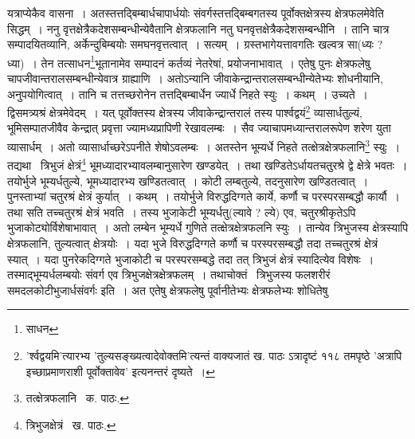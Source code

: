 \documentclass[11pt, openany]{book}
\begin{document}
\noindent यत्राप्येकैव वासना~। अतस्तत्तद्बिम्बार्धचापार्धयोः संवर्गस्तत्तद्बिम्बगतस्य पूर्वोक्तक्षेत्रस्य क्षेत्रफलमेवेति सिद्धम्~। ननु वृत्तक्षेत्रैकदेशसम्बन्धीन्येवैतानि क्षेत्रफलानि नतु घनवृत्तक्षेत्रैकदेशसम्बन्धीनि~। तानि चात्र सम्पादयितव्यानि, अर्केन्दुबिम्बयोः समघनवृत्तत्वात्~। सत्यम्~। ग्रस्तभागेयत्तावगतिः खल्वत्र सा(ध्यः ? ध्या)~। तेन तत्साधन\renewcommand{\thefootnote}{१}\footnote{साधन}भूतानामेव सम्पादनं कर्तव्यं नेतरेषां, प्रयोजनाभावात्~। एतेषु पुनः क्षेत्रफलेषु चापजीवान्तरालसम्बन्धीन्येवात्र ग्राह्याणि~। अतोऽन्यानि जीवाकेन्द्रान्तरालसम्बन्धीन्येतेभ्यः शोधनीयानि, अनुपयोगित्वात्~। तानि च तत्तच्छरोनेन तत्तद्बिम्बार्धेन ज्यार्धे निहते स्युः~। कथम्~। उच्यते~। द्विसमत्र्यश्रं क्षेत्रमेवेदम्~। यत् पूर्वोक्तस्य क्षेत्रस्य जीवाकेन्द्रान्तरालं तस्य पार्श्वद्वयं\renewcommand{\thefootnote}{*}\footnote{'र्श्वद्वयमि'त्यारभ्य 'तुल्यसङ्ख्यत्वादेवोक्तमि'त्यन्तं वाक्यजातं ख. पाठः ऽत्रादृष्टं ११८ तमपृष्ठे 'अत्रापि इच्छाप्रमाणराशी पूर्वोक्तावेव' इत्यनन्तरं दृष्यते~।} व्यासार्धतुल्यं, भूमिसम्पातजीवैव केन्द्रात् प्रवृत्ता ज्यामध्यप्रापिणी रेखावलम्बः~। सैव ज्याचापमध्यान्तरालरूपेण शरेण युता व्यासार्धम्~। अतो व्यासार्धाच्छरेऽपनीते शेषोऽवलम्बः~। अतस्तेन भूम्यर्धे निहते तत्क्षेत्रक्षेत्रफलानि\renewcommand{\thefootnote}{२}\footnote{तत्क्षेत्रफलानि \textendash\ क. पाठः.} स्युः~। तद्यथा \textendash\ त्रिभुजं क्षेत्रं\renewcommand{\thefootnote}{३}\footnote{त्रिभुजक्षेत्रं \textendash\ ख. पाठः.} भूमध्यादारभ्यावलम्बानुसारेण खण्डयेत्~। तथा खण्डितेऽर्धायतचतुरश्रे द्वे क्षेत्रे भवतः~। तयोर्भुजे भूम्यर्धतुल्ये, भूमध्यादारभ्य खण्डितत्वात्~।
कोटी लम्बतुल्ये, तदनुसारेण खण्डितत्वात्~। पुनस्ताभ्यां चतुरश्रं क्षेत्रं कुर्यात्~। कथम्~। तयोर्भुजे विरुद्धदिग्गते कार्ये, कर्णौ च परस्परसम्बद्धौ कार्यौ~। तथा सति तच्चतुरश्रं क्षेत्रं भवति~। तस्य भुजाकेटी भूम्यर्धतु(ल्यावे ? ल्ये) एव, चतुरश्रीकृतेऽपि भुजाकोट्योर्विशेषाभावात्~। अतो लम्बेन भूम्यर्धे गुणिते तत्क्षेत्रक्षेत्रफलनि स्युः~। तान्येव त्रिभुजस्य क्षेत्रस्यापि क्षेत्रफलानि, तुल्यत्वात् क्षेत्रयोः~। यदा भुजे विरुद्धदिग्गते कर्णौ च परस्परसम्बद्धौ तदा तच्चतुरश्रं क्षेत्रं स्यात्~। यदा पुनरेकदिग्गते भुजाकोटी च परस्परसम्बद्धे तदा तत् त्रिभुजं क्षेत्रं स्यादित्येव विशेषः~। तस्माद्भूम्यर्धलम्बयोः संवर्ग एव त्रिभुजक्षेत्रक्षेत्रफलम्~। तथाचोक्तं \textendash\ {\qt त्रिभुजस्य फलशरीरं समदलकोटीभुजार्धसंवर्गः} इति~। अत एतेषु क्षेत्रफलेषु पूर्वानीतेभ्यः क्षेत्रफलेभ्यः शोधितेषु

\newpage
\end{document}
